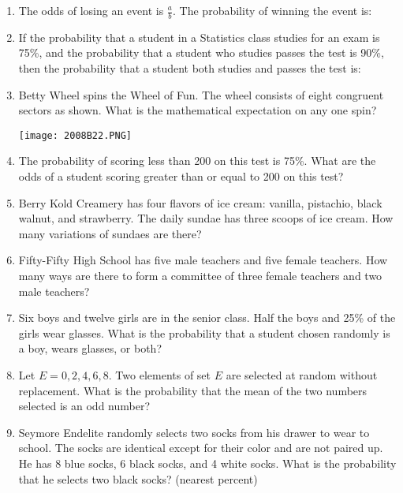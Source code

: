 \documentclass[../uilmath.tex]{subfiles}
\begin{document}
\begin{enumerate}[label=\bfseries\arabic*.]
    \item %
    The odds of losing an event is $\frac{a}{b}$. The probability of winning the event is:

    \item %
    If the probability that a student in a Statistics class studies for an exam is 75\%, and the probability that a student who 
    studies passes the test is 90\%, then the probability that a student both studies and passes the test is: 

    \item %
    Betty Wheel spins the Wheel of Fun. The wheel consists of eight congruent sectors as shown. What is the mathematical expectation on any one spin?
    \begin{center}
        \texttt{[image: 2008B22.PNG]}
    \end{center}

    \item %
    The probability of scoring less than 200 on this test is 75\%. What are the odds of a student scoring greater than or equal to 200 on this test?

    \item %
    Berry Kold Creamery has four flavors of ice cream: vanilla, pistachio, black walnut, and strawberry. The daily sundae has three scoops of ice cream. How many variations of sundaes are there?

    \item %
    Fifty-Fifty High School has five male teachers and five female teachers. How many ways are there to form a committee of three female teachers and two male teachers?

    \item %
    Six boys and twelve girls are in the senior class. Half the boys and 25\% of the girls wear glasses. What is the probability that a student chosen randomly is a boy, wears glasses, or both?

    \item %
    Let $E={0,2,4,6,8}$. Two elements of set $E$ are selected at random without replacement.
    What is the probability that the mean of the two numbers selected is an odd number?

    \item %
    Seymore Endelite randomly selects two socks from his drawer to wear to school. The socks are identical except for their color 
    and are not paired up. He has 8 blue socks, 6 black socks, and 4 white socks. What is the probability that he selects two black socks? (nearest percent)


\end{enumerate}
\end{document}
